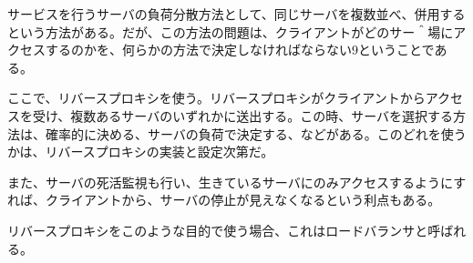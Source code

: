 サービスを行うサーバの負荷分散方法として、同じサーバを複数並べ、併用するという方法がある。だが、この方法の問題は、クライアントがどのサー＾場にアクセスするのかを、何らかの方法で決定しなければならない9ということである。

ここで、リバースプロキシを使う。リバースプロキシがクライアントからアクセスを受け、複数あるサーバのいずれかに送出する。この時、サーバを選択する方法は、確率的に決める、サーバの負荷で決定する、などがある。このどれを使うかは、リバースプロキシの実装と設定次第だ。

また、サーバの死活監視も行い、生きているサーバにのみアクセスするようにすれば、クライアントから、サーバの停止が見えなくなるという利点もある。

リバースプロキシをこのような目的で使う場合、これはロードバランサと呼ばれる。

